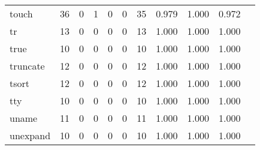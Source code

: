 \begin{longtable}{lp{1.10cm}p{1.10cm}p{1.10cm}p{1.10cm}p{1.10cm}p{1.10cm}p{1.10cm}p{1.10cm}p{1.10cm}p{1.10cm}}
touch     &                     36 &                                  0 &                                 1 &                                0 &                                 0 &                              35 &                          0.979 &                                 1.000 &                               0.972 \\
tr        &                     13 &                                  0 &                                 0 &                                0 &                                 0 &                              13 &                          1.000 &                                 1.000 &                               1.000 \\
true      &                     10 &                                  0 &                                 0 &                                0 &                                 0 &                              10 &                          1.000 &                                 1.000 &                               1.000 \\
truncate  &                     12 &                                  0 &                                 0 &                                0 &                                 0 &                              12 &                          1.000 &                                 1.000 &                               1.000 \\
tsort     &                     12 &                                  0 &                                 0 &                                0 &                                 0 &                              12 &                          1.000 &                                 1.000 &                               1.000 \\
tty       &                     10 &                                  0 &                                 0 &                                0 &                                 0 &                              10 &                          1.000 &                                 1.000 &                               1.000 \\
uname     &                     11 &                                  0 &                                 0 &                                0 &                                 0 &                              11 &                          1.000 &                                 1.000 &                               1.000 \\
unexpand  &                     10 &                                  0 &                                 0 &                                0 &                                 0 &                              10 &                          1.000 &                                 1.000 &                               1.000 \\

\end{longtable}
